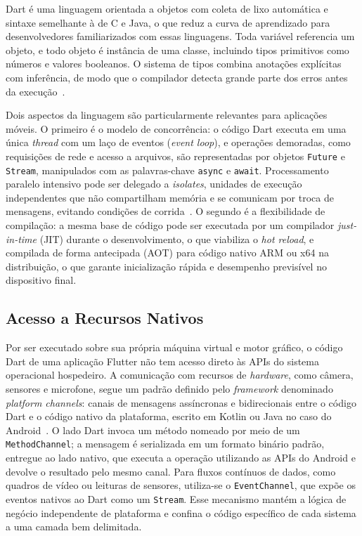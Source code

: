 Dart é uma linguagem orientada a objetos com coleta de lixo automática e sintaxe semelhante à de C e Java, o que reduz a curva de aprendizado para desenvolvedores familiarizados com essas linguagens. Toda variável referencia um objeto, e todo objeto é instância de uma classe, incluindo tipos primitivos como números e valores booleanos. O sistema de tipos combina anotações explícitas com inferência, de modo que o compilador detecta grande parte dos erros antes da execução~\cite{dart_docs}.

Dois aspectos da linguagem são particularmente relevantes para aplicações móveis. O primeiro é o modelo de concorrência: o código Dart executa em uma única \textit{thread} com um laço de eventos (\textit{event loop}), e operações demoradas, como requisições de rede e acesso a arquivos, são representadas por objetos \texttt{Future} e \texttt{Stream}, manipulados com as palavras-chave \texttt{async} e \texttt{await}. Processamento paralelo intensivo pode ser delegado a \textit{isolates}, unidades de execução independentes que não compartilham memória e se comunicam por troca de mensagens, evitando condições de corrida~\cite{dart_docs}. O segundo é a flexibilidade de compilação: a mesma base de código pode ser executada por um compilador \textit{just-in-time} (JIT) durante o desenvolvimento, o que viabiliza o \textit{hot reload}, e compilada de forma antecipada (AOT) para código nativo ARM ou x64 na distribuição, o que garante inicialização rápida e desempenho previsível no dispositivo final.

\subsection{Acesso a Recursos Nativos}

Por ser executado sobre sua própria máquina virtual e motor gráfico, o código Dart de uma aplicação Flutter não tem acesso direto às APIs do sistema operacional hospedeiro. A comunicação com recursos de \textit{hardware}, como câmera, sensores e microfone, segue um padrão definido pelo \textit{framework} denominado \textit{platform channels}: canais de mensagens assíncronas e bidirecionais entre o código Dart e o código nativo da plataforma, escrito em Kotlin ou Java no caso do Android~\cite{flutter_platform_channels}. O lado Dart invoca um método nomeado por meio de um \texttt{MethodChannel}; a mensagem é serializada em um formato binário padrão, entregue ao lado nativo, que executa a operação utilizando as APIs do Android e devolve o resultado pelo mesmo canal. Para fluxos contínuos de dados, como quadros de vídeo ou leituras de sensores, utiliza-se o \texttt{EventChannel}, que expõe os eventos nativos ao Dart como um \texttt{Stream}. Esse mecanismo mantém a lógica de negócio independente de plataforma e confina o código específico de cada sistema a uma camada bem delimitada.

